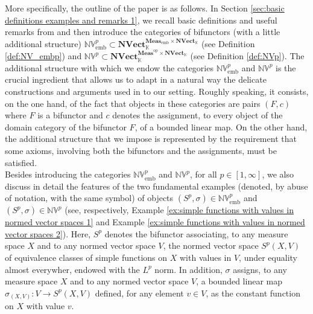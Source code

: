 \documentclass{amsart}
\theoremstyle{definition}
\theoremstyle{plain}
\newcommand{\opMeas}{\mathbf{Meas}^\mathrm{op}}
\newcommand{\embMeas}{\mathbf{Meas}_\mathrm{emb}}
\newcommand{\NVect}{\mathbf{NVect}_{\mathbb{K}}}
\newcommand{\NVembp}{\mathbb{NV}_{\mathrm{emb}}^p}
\newcommand{\NVp}{\mathbb{NV}^p}
\begin{document}
        More specifically, the outline of the paper is as follows.
        In Section \ref{sec:basic definitions examples and remarks 1}, we recall basic definitions and useful remarks from \cite{Leinster2023} and then introduce the categories of bifunctors (with a little additional structure) $\NVembp \subset \NVect^{\embMeas \times \NVect}$ (see Definition \ref{def:NV_embp}) and $\NVp \subset \NVect^{\opMeas \times \NVect}$ (see Definition \ref{def:NVp}).
        The additional structure with which we endow the categories $\NVembp$ and $\NVp$ is the crucial ingredient that allows us to adapt in a natural way the delicate constructions and arguments used in \cite{Leinster2023} to our setting. 
        Roughly speaking, it consists, on the one hand, of the fact that objects in these categories are pairs $(F,c)$ where $F$ is a bifunctor and $c$ denotes the assignment, to every object of the domain category of the bifunctor $F$, of a bounded linear map.
        On the other hand, the additional structure that we impose is represented by the requirement that some axioms, involving both the bifunctors and the assignments, must be satisfied. \\ 
        Besides introducing the categories $\NVembp$ and $\NVp$, for all $p \in [1,\infty]$, we also discuss in detail the features of the two fundamental examples (denoted, by abuse of notation, with the same symbol) of objects $(S^p,\sigma) \in \NVembp$ and $(S^p,\sigma) \in \NVp$ (see, respectively, Example \ref{ex:simple functions with values in normed vector spaces 1} and Example \ref{ex:simple functions with values in normed vector spaces 2}).
        Here, $S^p$ denotes the bifunctor associating, to any measure space $X$ and to any normed vector space $V$, the normed vector space $S^p(X,V)$ of equivalence classes of simple functions on $X$ with values in $V$, under equality almost everywher, endowed with the $L^p$ norm.
        In addition, $\sigma$ assigns, to any measure space $X$ and to any normed vector space $V$, a bounded linear map $\sigma_{(X,V)} \colon V \rightarrow S^p(X,V)$ defined, for any element $v \in V$, as the constant function on $X$ with value $v$.
\end{document}
